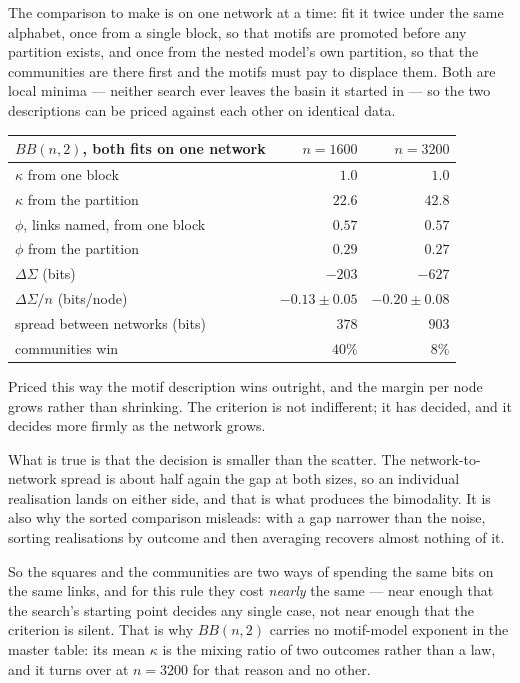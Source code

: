 The comparison to make is on one network at a time: fit it twice under the same
alphabet, once from a single block, so that motifs are promoted before any
partition exists, and once from the nested model's own partition, so that the
communities are there first and the motifs must pay to displace them. Both are
local minima --- neither search ever leaves the basin it started in --- so the
two descriptions can be priced against each other on identical data.

\begin{center}
\small\setlength{\tabcolsep}{4pt}
\begin{tabular}{lrr}
\hline
$BB(n,2)$, both fits on one network & $n=1600$ & $n=3200$\\
\hline
$\kappa$ from one block             & $1.0$ & $1.0$\\
$\kappa$ from the partition         & $22.6$ & $42.8$\\
$\phi$, links named, from one block & $0.57$ & $0.57$\\
$\phi$ from the partition           & $0.29$ & $0.27$\\
\hline
$\Delta\Sigma$ (bits)               & $-203$ & $-627$\\
$\Delta\Sigma/n$ (bits/node)        & $-0.13\pm0.05$ & $-0.20\pm0.08$\\
spread between networks (bits)      & $378$ & $903$\\
communities win                     & $40\%$ & $8\%$\\
\hline
\end{tabular}
\end{center}

\noindent Priced this way the motif description wins outright, and the margin per
node grows rather than shrinking. The criterion is not indifferent; it has
decided, and it decides more firmly as the network grows.

What is true is that the decision is smaller than the scatter. The
network-to-network spread is about half again the gap at both sizes, so an
individual realisation lands on either side, and that is what produces the
bimodality. It is also why the sorted comparison misleads: with a gap narrower
than the noise, sorting realisations by outcome and then averaging recovers
almost nothing of it.

So the squares and the communities are two ways of spending the same bits on the
same links, and for this rule they cost \emph{nearly} the same --- near enough
that the search's starting point decides any single case, not near enough that
the criterion is silent. That is why $BB(n,2)$ carries no motif-model exponent in
the master table: its mean $\kappa$ is the mixing ratio of two outcomes rather
than a law, and it turns over at $n=3200$ for that reason and no other.

